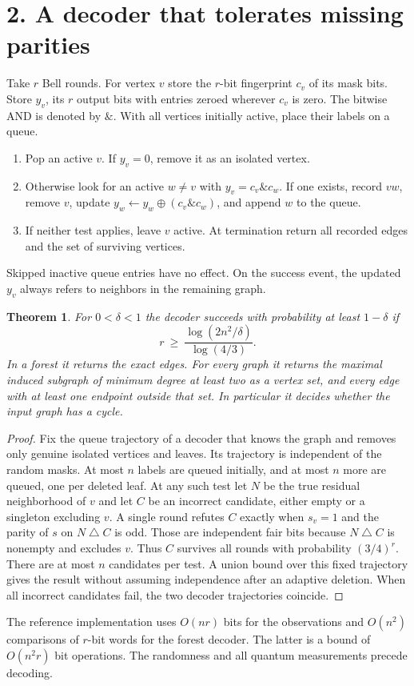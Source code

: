 \documentclass[11pt]{article}
\newtheorem*{theorem}{Theorem}
\begin{document}
\newpage
\section*{2. A decoder that tolerates missing parities}
Take $r$ Bell rounds. For vertex $v$ store the $r$-bit fingerprint $c_v$ of
its mask bits. Store $y_v$, its $r$ output bits with entries zeroed wherever
$c_v$ is zero. The bitwise AND is denoted by $\mathbin{\&}$.
With all vertices initially active, place their labels on a queue.
\begin{enumerate}
\item Pop an active $v$. If $y_v=0$, remove it as an isolated vertex.
\item Otherwise look for an active $w\ne v$ with $y_v=c_v\mathbin{\&}c_w$.
If one exists, record $vw$, remove $v$, update
$y_w\gets y_w\mathbin{\oplus}(c_v\mathbin{\&}c_w)$, and append $w$ to the queue.
\item If neither test applies, leave $v$ active. At termination return all
recorded edges and the set of surviving vertices.
\end{enumerate}
Skipped inactive queue entries have no effect. On the success event,
the updated $y_v$ always refers to neighbors in the remaining graph.

\begin{theorem}
For $0<\delta<1$ the decoder succeeds with probability at least $1-\delta$ if
\[
 r\ \ge\ \frac{\log(2n^2/\delta)}{\log(4/3)} .
\]
In a forest it returns the exact edges. For every graph it returns the
maximal induced subgraph of minimum degree at least two as a vertex set,
and every edge with at least one endpoint outside that set. In particular
it decides whether the input graph has a cycle.
\end{theorem}
\begin{proof}
Fix the queue trajectory of a decoder that knows the graph and removes
only genuine isolated vertices and leaves. Its trajectory is independent
of the random masks. At most $n$ labels are queued initially, and at most
$n$ more are queued, one per deleted leaf. At any such test let $N$ be
the true residual neighborhood of $v$ and let $C$ be an incorrect
candidate, either empty or a singleton excluding $v$. A single round
refutes $C$ exactly when $s_v=1$ and the parity of $s$ on
$N\mathbin{\triangle}C$ is odd. Those are independent fair bits because
$N\mathbin{\triangle}C$ is nonempty and excludes $v$. Thus $C$ survives
all rounds with probability $(3/4)^r$. There are at most $n$ candidates
per test. A union bound over this fixed trajectory gives the result
without assuming independence after an adaptive deletion. When all
incorrect candidates fail, the two decoder trajectories coincide.
\end{proof}
The reference implementation uses $O(nr)$ bits for the observations and
$O(n^2)$ comparisons of $r$-bit words for the forest decoder. The latter
is a bound of $O(n^2r)$ bit operations. The randomness and all quantum
measurements precede decoding.
\end{document}
